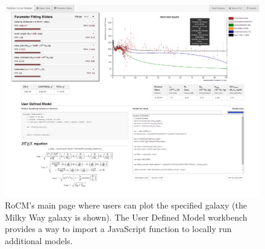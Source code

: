\documentclass[conference]{IEEEtran-modified}
\begin{document}
\begin{figure}[h!]
\centering
\includegraphics[width=\textwidth, frame, trim = -1cm -1cm -1cm -1cm, clip]{rocm_screenshot_full}
\caption{RoCM's main page where users can plot the specified galaxy (the Milky Way galaxy is shown). The User Defined Model workbench provides a way to import a JavaScript function to locally run additional models.}
\label{rocm_fig}
\end{figure}
\end{document}
